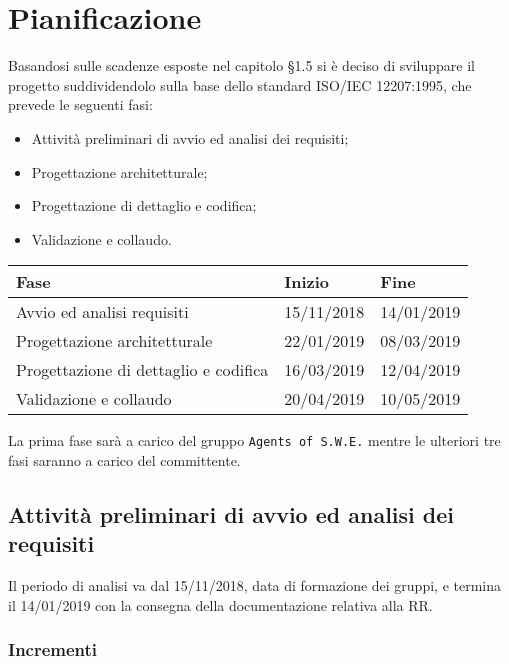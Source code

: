 \section{Pianificazione}

Basandosi sulle scadenze esposte nel capitolo §1.5 si è deciso di sviluppare il progetto suddividendolo sulla base dello standard ISO/IEC 12207:1995, che prevede le seguenti fasi:
\begin{itemize}
	\item Attività preliminari di avvio ed analisi dei requisiti;
	\item Progettazione architetturale;
	\item Progettazione di dettaglio e codifica;
	\item Validazione e collaudo.
\end{itemize}

\begin{longtable}{ m{8cm} m{3cm} p{3cm} }
\hline

\rowcolor{bluelogo}\color{white}\textbf{Fase} & \color{white}\textbf{Inizio} & \color{white}\textbf{Fine} \\
\hline
\rowcolor{beigechiaro} \color{black} Avvio ed analisi requisiti & 15/11/2018 & 14/01/2019 \\
\rowcolor{beigescuro} \color{black} Progettazione architetturale & 22/01/2019 & 08/03/2019 \\
\rowcolor{beigechiaro} \color{black} Progettazione di dettaglio e codifica & 16/03/2019 & 12/04/2019 \\
\rowcolor{beigescuro} \color{black} Validazione e collaudo & 20/04/2019 & 10/05/2019 \\

\hline
\end{longtable}

La prima fase sarà a carico del gruppo \texttt{Agents of S.W.E.} mentre le ulteriori tre fasi saranno a carico del committente.

\subsection{Attività preliminari di avvio ed analisi dei requisiti}

Il periodo di analisi va dal 15/11/2018, data di formazione dei gruppi, e termina il 14/01/2019 con la consegna della documentazione relativa alla RR.

\subsubsection{Incrementi}

